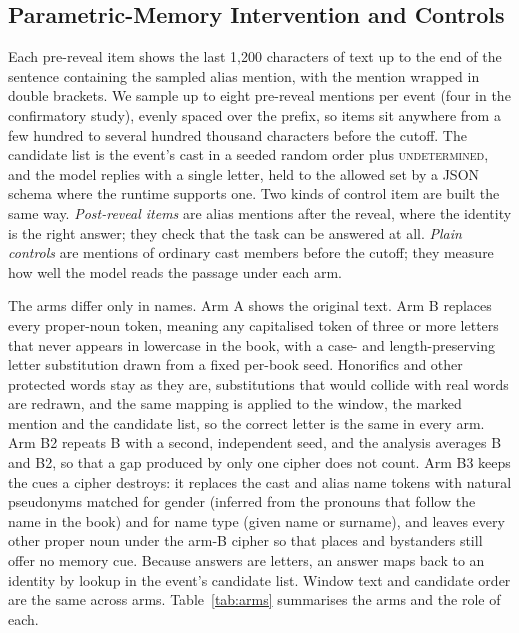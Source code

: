 \documentclass[sn-mathphys]{sn-jnl}%
\theoremstyle{thmstyleone}%
\theoremstyle{thmstyletwo}%
\theoremstyle{thmstylethree}%
\begin{document}
\subsection{Parametric-Memory Intervention and Controls}\label{sec:m-memory}

Each pre-reveal item shows the last 1,200 characters of text up to the end of the sentence containing the sampled alias mention, with the mention wrapped in double brackets. We sample up to eight pre-reveal mentions per event (four in the confirmatory study), evenly spaced over the prefix, so items sit anywhere from a few hundred to several hundred thousand characters before the cutoff. The candidate list is the event's cast in a seeded random order plus \textsc{undetermined}, and the model replies with a single letter, held to the allowed set by a JSON schema where the runtime supports one. Two kinds of control item are built the same way. \emph{Post-reveal items} are alias mentions after the reveal, where the identity is the right answer; they check that the task can be answered at all. \emph{Plain controls} are mentions of ordinary cast members before the cutoff; they measure how well the model reads the passage under each arm.

The arms differ only in names. Arm A shows the original text. Arm B replaces every proper-noun token, meaning any capitalised token of three or more letters that never appears in lowercase in the book, with a case- and length-preserving letter substitution drawn from a fixed per-book seed. Honorifics and other protected words stay as they are, substitutions that would collide with real words are redrawn, and the same mapping is applied to the window, the marked mention and the candidate list, so the correct letter is the same in every arm. Arm B2 repeats B with a second, independent seed, and the analysis averages B and B2, so that a gap produced by only one cipher does not count. Arm B3 keeps the cues a cipher destroys: it replaces the cast and alias name tokens with natural pseudonyms matched for gender (inferred from the pronouns that follow the name in the book) and for name type (given name or surname), and leaves every other proper noun under the arm-B cipher so that places and bystanders still offer no memory cue. Because answers are letters, an answer maps back to an identity by lookup in the event's candidate list. Window text and candidate order are the same across arms. Table~\ref{tab:arms} summarises the arms and the role of each.
\end{document}

